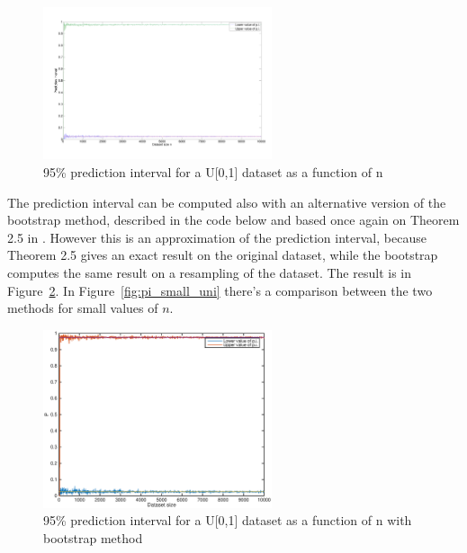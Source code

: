 \documentclass[10pt]{article}
\begin{document}
\begin{figure}[h!]
  \centering
  \includegraphics[width=0.6\textwidth]{images/hw1_4_d_uni}
  \caption{95\% prediction interval for a U[0,1] dataset as a function of n}
  \label{fig:pi_uni}
\end{figure}

The prediction interval can be computed also with an alternative version of the bootstrap method, described in the code below and based once again on Theorem 2.5 in \cite{leb}. However this is an approximation of the prediction interval, because Theorem 2.5 gives an exact result on the original dataset, while the bootstrap computes the same result on a resampling of the dataset. The result is in Figure~\ref{fig:pi_uni_boot}. In Figure~\ref{fig:pi_small_uni} there's a comparison between the two methods for small values of $n$.



\begin{figure}[h!]
  \centering
  \includegraphics[width=0.6\textwidth]{images/hw1_4_d_uni_boot}
  \caption{95\% prediction interval for a U[0,1] dataset as a function of n with bootstrap method}
  \label{fig:pi_uni_boot}
\end{figure}

\clearpage
\end{document}
